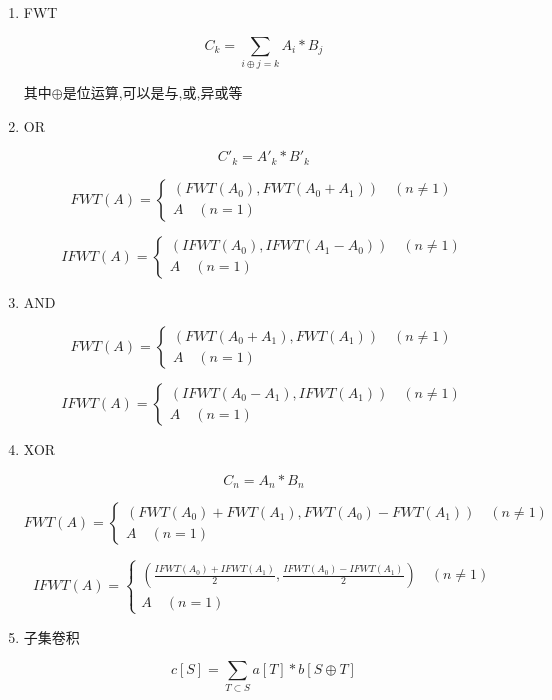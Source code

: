 \begin{enumerate}

\item FWT

$$C_k=\sum_{i\oplus j = k} A_i*B_j$$

其中$\oplus$是位运算,可以是与,或,异或等

\item OR

$$C'_k=A'_k*B'_k$$

$$FWT(A)=
\begin{cases}
(FWT(A_0),FWT(A_0+A_1))\quad(n\neq 1)\\
A\quad(n=1)
\end{cases}$$

$$IFWT(A)=
\begin{cases}
(IFWT(A_0),IFWT(A_1-A_0))\quad(n \neq 1)\\
A\quad(n = 1)
\end{cases}
$$

\item AND

$$FWT(A)=
\begin{cases}
(FWT(A_0+A_1),FWT(A_1))\quad(n\neq 1)\\
A\quad (n=1)
\end{cases}$$

$$IFWT(A)=
\begin{cases}
(IFWT(A_0-A_1),IFWT(A_1))\quad (n\neq 1)\\
A\quad(n=1)
\end{cases}$$

\item XOR

$$
C_n=A_n*B_n
$$

$$FWT(A)=
\begin{cases}
(FWT(A_0)+FWT(A_1),FWT(A_0)-FWT(A_1))\quad (n \neq 1)\\
A\quad (n = 1)
\end{cases}$$

$$IFWT(A)=
\begin{cases}
(\frac{IFWT(A_0)+IFWT(A_1)}{2},\frac{IFWT(A_0)-IFWT(A_1)}{2})\quad(n\neq 1)\\
A\quad(n=1)
\end{cases}$$

\item 子集卷积

$$c[S]=\sum_{T\subset S}a[T]*b[S\oplus T]$$

\end{enumerate}
